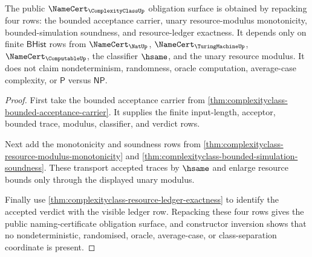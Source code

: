 \begin{theorem}
\label{thm:complexityclass-namecert-obligation-surface}
The public $\NameCert_{\ComplexityClassUp}$ obligation surface is obtained by
repacking four rows: the bounded acceptance carrier, unary resource-modulus
monotonicity, bounded-simulation soundness, and resource-ledger exactness. It
depends only on finite $\mathsf{BHist}$ rows from $\NameCert_{\NatUp}$,
$\NameCert_{\TuringMachineUp}$, $\NameCert_{\ComputableUp}$, the classifier
$\hsame$, and the unary resource modulus. It does not claim nondeterminism,
randomness, oracle computation, average-case complexity, or $\mathsf{P}$ versus
$\mathsf{NP}$.
\end{theorem}
\begin{proof}
First take the bounded acceptance carrier from
\autoref{thm:complexityclass-bounded-acceptance-carrier}. It supplies the
finite input-length, acceptor, bounded trace, modulus, classifier, and verdict
rows.

Next add the monotonicity and soundness rows from
\autoref{thm:complexityclass-resource-modulus-monotonicity} and
\autoref{thm:complexityclass-bounded-simulation-soundness}. These transport
accepted traces by $\hsame$ and enlarge resource bounds only through the
displayed unary modulus.

Finally use \autoref{thm:complexityclass-resource-ledger-exactness} to identify
the accepted verdict with the visible ledger row. Repacking these four rows
gives the public naming-certificate obligation surface, and constructor
inversion shows that no nondeterministic, randomised, oracle, average-case, or
class-separation coordinate is present.
\end{proof}

